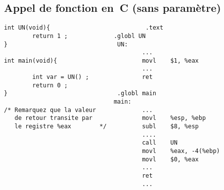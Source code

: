 \begin{frame}
  \section{Appel de fonction en~C (sans param\`etre)}%
        \begin{verbatim}
int UN(void){                           .text                        
        return 1 ;             .globl UN                        
}                               UN:                                
                                       ...                        
int main(void){                        movl    $1, %eax        
                                       ...                        
        int var = UN() ;               ret                       
        return 0 ;                     
}                               .globl main                        
                               main:                                
/* Remarquez que la valeur             ...                        
   de retour transite par              movl    %esp, %ebp        
   le registre %eax        */          subl    $8, %esp        
                                       ....                        
                                       call    UN                
                                       movl    %eax, -4(%ebp)        
                                       movl    $0, %eax        
                                       ...                        
                                       ret                        
                                       ...                     
\end{verbatim}
\end{frame}

